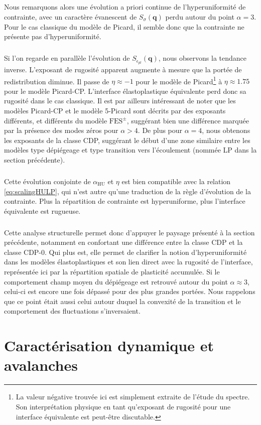 \subparagraph{}Nous remarquons alors une évolution a priori continue de l'hyperuniformité de contrainte, avec un caractère évanescent de $S_\sigma(\mathbf{q})$ perdu autour du point $\alpha=3$. Pour le cas classique du modèle de Picard, il semble donc que la contrainte ne présente pas d'hyperuniformité.

\subparagraph{}Si l'on regarde en parallèle l'évolution de $S_{\epsilon_{pl}}(\mathbf{q})$, nous observons la tendance inverse. L'exposant de rugosité apparent augmente à mesure que la portée de redistribution diminue. Il passe de $\eta\approx -1$ pour le modèle de Picard\footnote{La valeur négative trouvée ici est simplement extraite de l'étude du spectre. Son interprétation physique en tant qu'exposant de rugosité pour une interface équivalente est peut-être discutable.} à $\eta\approx 1.75$ pour le modèle Picard-CP. L'interface élastoplastique équivalente perd donc sa rugosité dans le cas classique. Il est par ailleurs intéressant de noter que les modèles Picard-CP et le modèle 5-Picard sont décrits par des exposants différents, et différents du modèle $\text{FES}^\pm$, suggérant bien une différence marquée par la présence des modes zéros pour $\alpha>4$. De plus pour $\alpha=4$, nous obtenons les exposants de la classe CDP, suggérant le début d'une zone similaire entre les modèles type dépiégeage et type transition vers l'écoulement (nommée LP dans la section précédente).

\subparagraph{}Cette évolution conjointe de $\alpha_\text{HU}$ et $\eta$ est bien compatible avec la relation \autoref{eq:scalingHULP}, qui n'est autre qu'une traduction de la règle d'évolution de la contrainte. Plus la répartition de contrainte est hyperuniforme, plus l'interface équivalente est rugueuse.

\subparagraph{}Cette analyse structurelle permet donc d'appuyer le paysage présenté à la section précédente, notamment en confortant une différence entre la classe CDP et la classe CDP-0. Qui plus est, elle permet de clarifier la notion d'hyperuniformité dans les modèles élastoplastiques et son lien direct avec la rugosité de l'interface, représentée ici par la répartition spatiale de plasticité accumulée. Si le comportement champ moyen du dépiégeage est retrouvé autour du point $\alpha \approx 3$, celui-ci est encore une fois dépassé pour des plus grandes portées. Nous rappelons que ce point était aussi celui autour duquel la convexité de la transition et le comportement des fluctuations s'inversaient.

\section{Caractérisation dynamique et avalanches}

